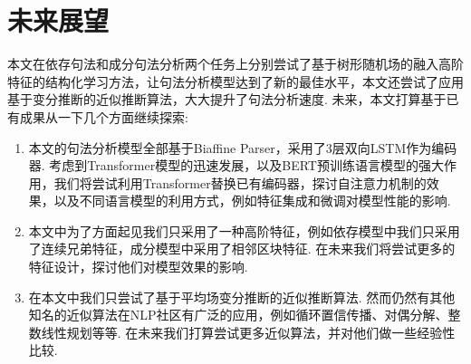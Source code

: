 \section{未来展望}
本文在依存句法和成分句法分析两个任务上分别尝试了基于树形随机场的融入高阶特征的结构化学习方法，让句法分析模型达到了新的最佳水平，本文还尝试了应用基于变分推断的近似推断算法，大大提升了句法分析速度.
未来，本文打算基于已有成果从一下几个方面继续探索:
\begin{enumerate}
  \item 本文的句法分析模型全部基于Biaffine Parser，采用了3层双向LSTM作为编码器.
        考虑到Transformer模型的迅速发展，以及BERT预训练语言模型的强大作用，我们将尝试利用Transformer替换已有编码器，探讨自注意力机制的效果，以及不同语言模型的利用方式，例如特征集成和微调对模型性能的影响.
  \item 本文中为了方面起见我们只采用了一种高阶特征，例如依存模型中我们只采用了连续兄弟特征，成分模型中采用了相邻区块特征.
        在未来我们将尝试更多的特征设计，探讨他们对模型效果的影响.
  \item 在本文中我们只尝试了基于平均场变分推断的近似推断算法.
        然而仍然有其他知名的近似算法在NLP社区有广泛的应用，例如循环置信传播、对偶分解、整数线性规划等等.
        在未来我们打算尝试更多近似算法，并对他们做一些经验性比较.
\end{enumerate}
